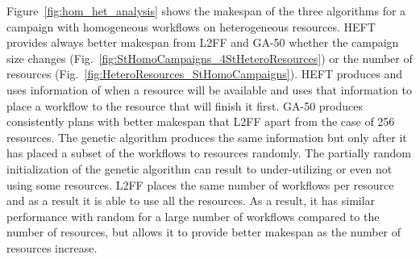 Figure~\ref{fig:hom_het_analysis} shows the makespan of the three algorithms for a campaign with homogeneous workflows on heterogeneous resources.
HEFT provides always better makespan from L2FF and GA-50 whether the campaign size changes (Fig.~\ref{fig:StHomoCampaigns_4StHeteroResources}) or the number of resources (Fig.~\ref{fig:HeteroResources_StHomoCampaigns}).
HEFT produces and uses information of when a resource will be available and uses that information to place a workflow to the resource that will finish it first.
GA-50 produces consistently plans with better makespan that L2FF apart from the case of 256 resources.
The genetic algorithm produces the same information but only after it has placed a subset of the workflows to resources randomly.
The partially random initialization of the genetic algorithm can result to under-utilizing or even not using some resources.
L2FF places the same number of workflows per resource and as a result it is able to use all the resources.
As a result, it has similar performance with random for a large number of workflows compared to the number of resources, but allows it to provide better makespan as the number of resources increase.



